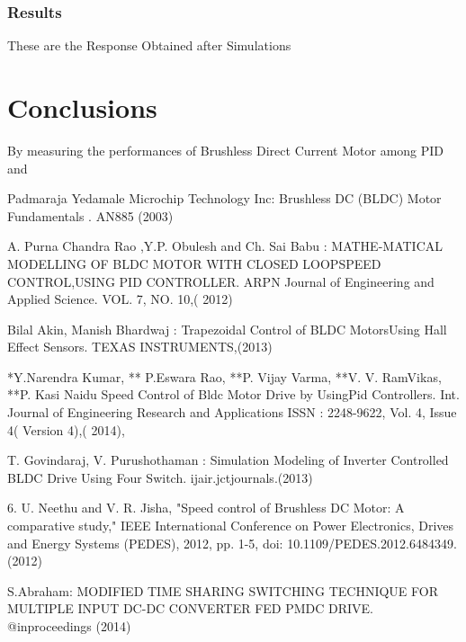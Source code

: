 \documentclass[12pt,openright,twoside]{report}
\begin{document}
\hspace{1cm}
\subsection{Results}
These are the Response Obtained after Simulations 





\chapter{Conclusions}
By measuring the performances of Brushless Direct Current Motor among PID and 


\newpage 




\cleardoublepage

\renewcommand\bibname{References}

\begin{thebibliography}{9}

 Padmaraja Yedamale Microchip Technology Inc: Brushless DC (BLDC) Motor    Fundamentals . AN885 (2003)

 A. Purna  Chandra  Rao ,Y.P. Obulesh and Ch. Sai Babu :  MATHE-MATICAL MODELLING OF BLDC MOTOR WITH CLOSED LOOPSPEED CONTROL,USING PID CONTROLLER. ARPN Journal of Engineering and Applied Science. VOL. 7, NO. 10,( 2012) 

 Bilal Akin, Manish Bhardwaj : Trapezoidal Control of BLDC MotorsUsing Hall Effect     Sensors. TEXAS INSTRUMENTS,(2013)

*Y.Narendra Kumar, ** P.Eswara Rao, **P. Vijay Varma, **V. V. RamVikas,  **P.  Kasi  Naidu  Speed  Control  of  Bldc  Motor  Drive  by  UsingPid Controllers.  Int. Journal of Engineering Research and Applications ISSN : 2248-9622, Vol. 4, Issue 4( Version 4),( 2014),  

 T. Govindaraj, V. Purushothaman : Simulation Modeling of Inverter Controlled BLDC Drive Using Four Switch. ijair.jctjournals.(2013) 

6.	U. Neethu and V. R. Jisha, "Speed control of Brushless DC Motor: A comparative        study,"  IEEE International Conference on Power Electronics, Drives and Energy Systems (PEDES), 2012, pp. 1-5, doi: 10.1109/PEDES.2012.6484349.(2012)

  S.Abraham: MODIFIED TIME SHARING SWITCHING TECHNIQUE FOR MULTIPLE  INPUT DC-DC CONVERTER FED PMDC DRIVE. @inproceedings
                 (2014)



\end{thebibliography}
\end{document}
